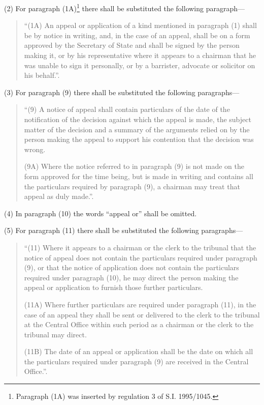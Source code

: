 \documentclass[a4paper]{article}
\begin{document}
(2) For paragraph (1A)\footnote{\frenchspacing Paragraph (1A) was inserted by regulation 3 of S.I. 1995/1045.} there shall be substituted the following paragraph—
\begin{quotation}
“(1A) An appeal or application of a kind mentioned in paragraph (1) shall be by notice in writing, and, in the case of an appeal, shall be on a form approved by the Secretary of State and shall be signed by the person making it, or by his representative where it appears to a chairman that he was unable to sign it personally, or by a barrister, advocate or solicitor on his behalf.”.
\end{quotation}

(3) For paragraph (9) there shall be substituted the following paragraphs—
\begin{quotation}
“(9) A notice of appeal shall contain particulars of the date of the notification of the decision against which the appeal is made, the subject matter of the decision and a summary of the arguments relied on by the person making the appeal to support his contention that the decision was wrong.

(9A) Where the notice referred to in paragraph (9) is not made on the form approved for the time being, but is made in writing and contains all the particulars required by paragraph (9), a chairman may treat that appeal as duly made.”.
\end{quotation}

(4) In paragraph (10) the words “appeal or” shall be omitted.

(5) For paragraph (11) there shall be substituted the following paragraphs—
\begin{quotation}
“(11) Where it appears to a chairman or the clerk to the tribunal that the notice of appeal does not contain the particulars required under paragraph (9), or that the notice of application does not contain the particulars required under paragraph (10), he may direct the person making the appeal or application to furnish those further particulars.

(11A) Where further particulars are required under paragraph (11), in the case of an appeal they shall be sent or delivered to the clerk to the tribunal at the Central Office within such period as a chairman or the clerk to the tribunal may direct.

(11B) The date of an appeal or application shall be the date on which all the particulars required under paragraph (9) are received in the Central Office.”.
\end{quotation}
\end{document}

